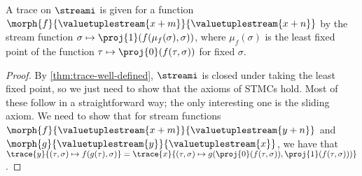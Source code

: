 \documentclass{lmcs}
\begin{document}
\begin{thm}
    A trace on \(\streami\) is given for a function \(
    \morph{f}{\valuetuplestream{x+m}}{\valuetuplestream{x+n}}
    \) by the stream function \(
    \sigma \mapsto \proj{1}(f(\mu_f(\sigma), \sigma))
    \), where \(\mu_f(\sigma)\) is the least fixed point of the function \(
    \tau \mapsto \proj{0}\mleft(f(\tau,\sigma)\mright)
    \) for fixed \(\sigma\).
\end{thm}
\begin{proof}
    By \cref{thm:trace-well-defined}, \(\streami\) is closed under taking the
    least fixed point, so we just need to show that the axioms of STMCs hold.
    Most of these follow in a straightforward way; the only interesting one is
    the sliding axiom.
    We need to show that for stream functions \(
    \morph{f}{\valuetuplestream{x+m}}{\valuetuplestream{y+n}}
    \) and \(
    \morph{g}{\valuetuplestream{y}}{\valuetuplestream{x}}
    \), we have that \(
    \trace{y}{(\tau, \sigma) \mapsto f(g(\tau), \sigma)}
    =
    \trace{x}{
        (\tau, \sigma)
        \mapsto
        g(\proj{0}\mleft(f(\tau, \sigma)\mright),
        \proj{1}\mleft(f(\tau, \sigma)\mright))
    }
    \).


\end{proof}
\end{document}
